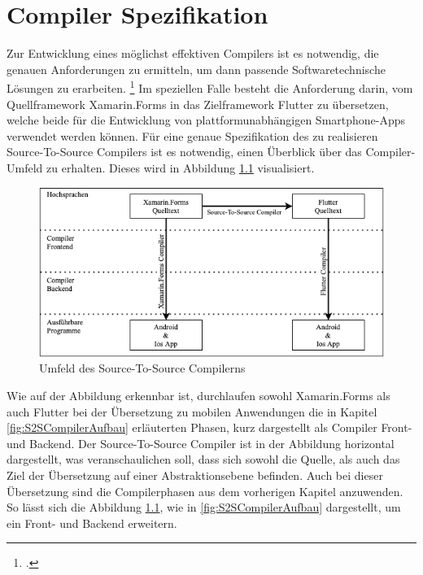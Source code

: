 \chapter{Compiler Spezifikation}
\label{chap:CompilerEntwurf}
Zur Entwicklung eines möglichst effektiven Compilers ist es notwendig, die genauen Anforderungen zu ermitteln,  um dann passende Softwaretechnische Lösungen zu erarbeiten. \footcite[Vgl.][S.6]{Balzert2011} Im speziellen Falle besteht die Anforderung darin, vom Quellframework Xamarin.Forms in das Zielframework Flutter zu übersetzen,  welche beide für die Entwicklung von plattformunabhängigen Smartphone-Apps verwendet werden können.  Für eine genaue Spezifikation des zu realisieren Source-To-Source Compilers ist es notwendig, einen Überblick über das Compiler-Umfeld zu erhalten.  Dieses wird in Abbildung \ref{fig:CompilerArchitecture} visualisiert. 

\begin{figure}[!ht]
 \includegraphics[width=\textwidth,keepaspectratio]{Images/CompilerArchitecture/CompilerStructure.png}
 \caption{Umfeld des Source-To-Source Compilerns}
 \label{fig:CompilerArchitecture}
\end{figure}

Wie auf der Abbildung erkennbar ist,  durchlaufen sowohl Xamarin.Forms als auch Flutter bei der Übersetzung zu mobilen Anwendungen die in Kapitel \ref{fig:S2SCompilerAufbau} erläuterten Phasen,  kurz dargestellt als Compiler Front- und Backend.  Der Source-To-Source Compiler ist in der Abbildung horizontal dargestellt,  was veranschaulichen soll,  dass sich sowohl die Quelle,  als auch das Ziel der Übersetzung auf einer Abstraktionsebene befinden.  Auch bei dieser Übersetzung sind die Compilerphasen aus dem vorherigen Kapitel anzuwenden.  So lässt sich die Abbildung \ref{fig:CompilerArchitecture},  wie in \ref{fig:S2SCompilerAufbau} dargestellt, um ein Front- und Backend erweitern.

